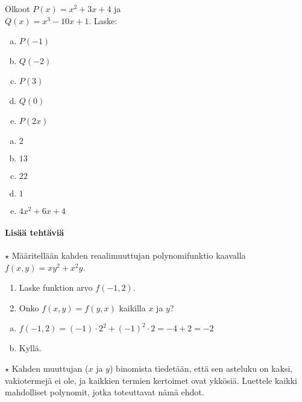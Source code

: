 \begin{tehtavasivu}
\begin{tehtava}
    Olkoot $P(x)=x^2+3x+4$ ja \\ $Q(x)=x^3-10x+1$. Laske:
    \begin{enumerate}[a)]
        \item $P(-1)$
        \item $Q(-2)$
        \item $P(3)$
        \item $Q(0)$
        \item $P(2x)$
    \end{enumerate}
    \begin{vastaus}
        \begin{enumerate}[a)]
            \item $2$
            \item $13$
            \item $22$
            \item $1$
            \item $4x^2+6x+4$
        \end{enumerate}
    \end{vastaus}
\end{tehtava}

\paragraph*{Lisää tehtäviä}

\begin{tehtava}
	$\star$ Määritellään kahden reaalimuuttujan polynomifunktio kaavalla $f(x,y)=xy^2+x^2y$.
		\begin{enumerate}
		\item Laske funktion arvo $f(-1,2)$.
		\item Onko $f(x,y)=f(y,x)$ kaikilla $x$ ja $y$?
		\end{enumerate}	
	
	\begin{vastaus}
		\begin{enumerate}[a)]
			\item $f(-1,2)=(-1)\cdot 2^2+(-1)^2 \cdot 2=-4+2=-2$
			\item Kyllä.
		\end{enumerate}
	\end{vastaus}
\end{tehtava}

\begin{tehtava}
	$\star$ Kahden muuttujan ($x$ ja $y$) binomista tiedetään, että sen asteluku on kaksi, vakiotermejä ei ole, ja kaikkien termien kertoimet ovat ykkösiä. Luettele kaikki mahdolliset polynomit, jotka toteuttavat nämä ehdot.
	

\end{tehtava}
\end{tehtavasivu}
